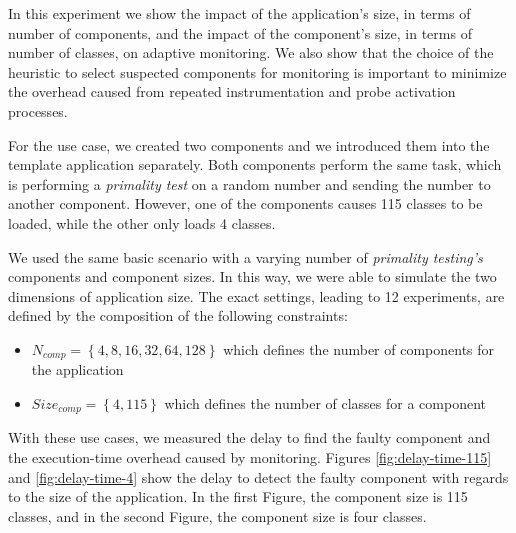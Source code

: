 In this experiment we show the impact of the application's size, in terms of number of components, and the impact of the component's size, in terms of number of classes, on adaptive monitoring. We also show that the choice of the heuristic to select suspected components for monitoring is important to minimize the overhead caused from repeated instrumentation and probe activation processes.

For the use case, we created two components and we introduced them into the template application separately.
Both components perform the same task, which is performing a \textit{primality test} on a random number and sending the number to another component.
However, one of the components causes 115 classes to be loaded, while the other only loads 4 classes.

We used the same basic scenario with a varying number of \textit{primality testing's} components and component sizes.
In this way, we were able to simulate the two dimensions of application size.
The exact settings, leading to 12 experiments, are defined by the composition of the following constraints:
\begin{itemize}
	\item $N_{comp} = \left\lbrace 4, 8, 16, 32, 64, 128 \right\rbrace$  which defines the number of components for the application
	\item $Size_{comp}=\left\lbrace 4, 115 \right\rbrace$ which defines the number of classes for a component
\end{itemize} 

With these use cases, we measured the delay to find the faulty component and the execution-time overhead caused by monitoring.
Figures \ref{fig:delay-time-115} and \ref{fig:delay-time-4} show the delay to detect the faulty component with regards to the size of the application.
In the first Figure, the component size is 115 classes, and in the second Figure, the component size is four classes.




